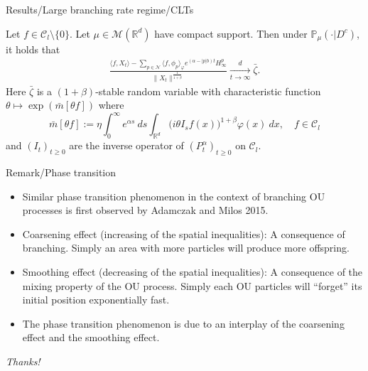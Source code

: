 \documentclass[xcolor=dvipsnames]{beamer}
\begin{document}
\begin{frame}{Results/Large branching rate regime/CLTs}
\begin{theorem}
\label{thm: large clt}
    Let $f\in \mathcal{C}_l\setminus\{0\}$.
    Let $\mu\in \mathcal M(\mathbb R^d)$ have compact support. 
    Then under $\mathbb{P}_{\mu}(\cdot|D^c)$, it holds that
\begin{align}\label{thm: large rate}
    \frac{\langle f, X_t\rangle-\sum_{p\in\mathcal{N}}\langle f,\phi_p\rangle_\varphi e^{(\alpha-|p|b)t}H^p_{\infty}}{\|X_t\|^\frac{1}{1+\beta}}\xrightarrow[t\to \infty]{d}\bar{\zeta}.
\end{align}
    Here $\bar{\zeta}$ is a $(1+\beta)$-stable random variable with characteristic function $\theta \mapsto \exp( \bar m[\theta f])$ where
\[
	\bar{m}[\theta f]
  := \eta\int_0^\infty e^{\alpha s}~ds \int_{\mathbb R^d} \big(i\theta I_sf(x)\big)^{1+\beta} \varphi(x)~dx,
  \quad f\in \mathcal C_l
\]
and $(I_t)_{t\geq 0}$ are the inverse operator of $(P_t^\alpha)_{t\geq 0}$ on $\mathcal{C}_l$.
\end{theorem}
\end{frame}

\begin{frame}{Remark/Phase transition}
\begin{itemize}
\item
	Similar phase transition phenomenon in the context of branching OU processes is first observed by Adamczak and Milos 2015.
 
\item
	Coarsening effect (increasing of the spatial inequalities): A consequence of branching. Simply an area with more particles will produce more offspring.
\item
	Smoothing effect (decreasing of the spatial inequalities):  
	A consequence of the mixing property of the OU process. Simply each OU particles will ``forget'' its initial position exponentially fast.
\item
	The phase transition phenomenon is due to an interplay of the coarsening effect and the smoothing effect.
\end{itemize}
\end{frame}
\begin{frame}
  \centering \Large
  \emph{Thanks!}
\end{frame}
\end{document}
